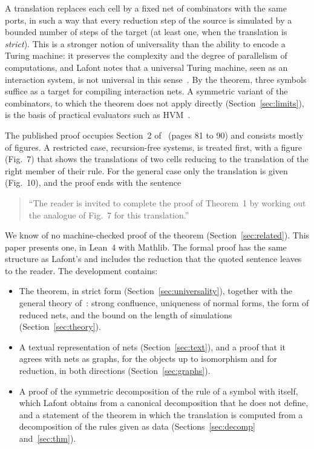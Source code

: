 \documentclass[11pt,a4paper]{article}
\newcommand{\pp}[1]{\cite[#1]{lafont1997}}
\begin{document}
A translation replaces each cell by a fixed net of combinators with the same ports, in such a
way that every reduction step of the source is simulated by a bounded number of steps of the
target (at least one, when the translation is \emph{strict}). This is a stronger notion of
universality than the ability to encode a Turing machine: it preserves the complexity and the
degree of parallelism of computations, and Lafont notes that a universal Turing machine, seen
as an interaction system, is not universal in this sense~\pp{p.~70}. By the theorem, three
symbols suffice as a target for compiling interaction nets. A symmetric variant of the
combinators, to which the theorem does not apply directly (Section~\ref{sec:limits}), is the
basis of practical evaluators such as HVM~\cite{hvm2}.

The published proof occupies Section~2 of~\cite{lafont1997} (pages 81 to 90) and consists
mostly of figures. A restricted case, recursion-free systems, is treated first, with a figure
(Fig.~7) that shows the translations of two cells reducing to the translation of the right
member of their rule. For the general case only the translation is given (Fig.~10), and the
proof ends with the sentence

\begin{quote}
``The reader is invited to complete the proof of Theorem~1 by working out the analogue of
Fig.~7 for this translation.'' \pp{p.~90}
\end{quote}

We know of no machine-checked proof of the theorem (Section~\ref{sec:related}). This paper
presents one, in Lean~4 with Mathlib. The formal proof has the same structure as Lafont's and
includes the reduction that the quoted sentence leaves to the reader. The development
contains:

\begin{itemize}
\item The theorem, in strict form (Section~\ref{sec:universality}), together with the general
  theory of~\cite[Section~1]{lafont1997}: strong confluence, uniqueness of normal forms, the
  form of reduced nets, and the bound on the length of simulations
  (Section~\ref{sec:theory}).
\item A textual representation of nets (Section~\ref{sec:text}), and a proof that it agrees with
  nets as graphs, for the objects up to isomorphism and for reduction, in both directions
  (Section~\ref{sec:graphs}).
\item A proof of the symmetric decomposition of the rule of a symbol with itself, which Lafont
  obtains from a canonical decomposition that he does not define, and a statement of the
  theorem in which the translation is computed from a decomposition of the rules given as data
  (Sections~\ref{sec:decomp} and~\ref{sec:thm}).
\end{itemize}
\end{document}
